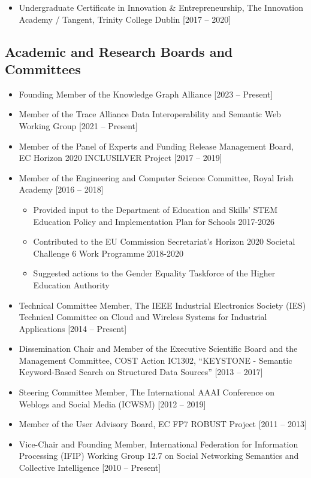 \documentclass[10pt,a4paper]{res} %
\begin{document}
\begin{resume}
\begin{itemize} \itemsep -2pt
\item Undergraduate Certificate in Innovation \& Entrepreneurship, The Innovation Academy / Tangent, Trinity College Dublin [2017 -- 2020]
\end{itemize}

\subsection*{Academic and Research Boards and Committees}
\begin{itemize} \itemsep -2pt
\item Founding Member of the Knowledge Graph Alliance [2023 -- Present]
\item Member of the Trace Alliance Data Interoperability and Semantic Web Working Group [2021 -- Present]
\item Member of the Panel of Experts and Funding Release Management Board, EC Horizon 2020 INCLUSILVER Project [2017 -- 2019]
\item Member of the Engineering and Computer Science Committee, Royal Irish Academy [2016 -- 2018]
\begin{itemize} \itemsep -2pt
\item Provided input to the Department of Education and Skills' STEM Education Policy and Implementation Plan for Schools 2017-2026
\item Contributed to the EU Commission Secretariat's Horizon 2020 Societal Challenge 6 Work Programme 2018-2020
\item Suggested actions to the Gender Equality Taskforce of the Higher Education Authority
\end{itemize}
\item Technical Committee Member, The IEEE Industrial Electronics Society (IES) Technical Committee on Cloud and Wireless Systems for Industrial Applications [2014 -- Present]
\item Dissemination Chair and Member of the Executive Scientific Board and the Management Committee, COST Action IC1302, ``KEYSTONE - Semantic Keyword-Based Search on Structured Data Sources'' [2013 -- 2017]
\item Steering Committee Member, The International AAAI Conference on Weblogs and Social Media (ICWSM) [2012 -- 2019]
\item Member of the User Advisory Board, EC FP7 ROBUST Project [2011 -- 2013]
\item Vice-Chair and Founding Member, International Federation for Information Processing (IFIP) Working Group 12.7 on Social Networking Semantics and Collective Intelligence [2010 -- Present]
\end{itemize}


\end{resume}
\end{document}
